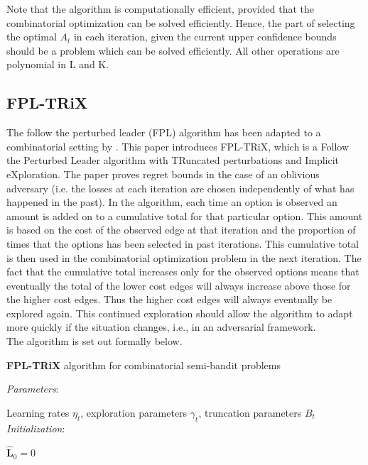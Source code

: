Note that the algorithm is computationally efficient, provided that the combinatorial optimization can be solved efficiently. Hence, the part of selecting the optimal $A_t$ in each iteration, given the current upper confidence bounds should be a problem which can be solved efficiently. All other operations are polynomial in L and K.\\


\subsection{FPL-TRiX}

The follow the perturbed leader (FPL) algorithm has been adapted to a combinatorial setting by \cite{neu2015first}. This paper introduces FPL-TRiX, which is a Follow the Perturbed Leader algorithm with TRuncated perturbations and Implicit eXploration. The paper proves regret bounds in the case of an oblivious adversary (i.e. the losses at each iteration are chosen independently of what has happened in the past). In the algorithm, each time an option is observed an amount is added on to a cumulative total for that particular option. This amount is based on the cost of the observed edge at that iteration and the proportion of times that the options has been selected in past iterations. This cumulative total is then used in the combinatorial optimization problem in the next iteration. The fact that the cumulative total increases only for the observed options means that eventually the total of the lower cost edges will always increase above those for the higher cost edges. Thus the higher cost edges will always eventually be explored again. This continued exploration should allow the algorithm to adapt more quickly if the situation changes, i.e., in an adversarial framework.\\

\noindent The algorithm is set out formally below.

\noindent \hrulefill

\noindent \textbf{FPL-TRiX} algorithm for combinatorial semi-bandit problems

\noindent \hrulefill

\noindent \textit{Parameters}:

Learning rates $\eta_t$, exploration parameters $\gamma_t$, truncation parameters $B_t$\\

\noindent \textit{Initialization}:

$\mathbf{\hat{L}}_0 = 0$

